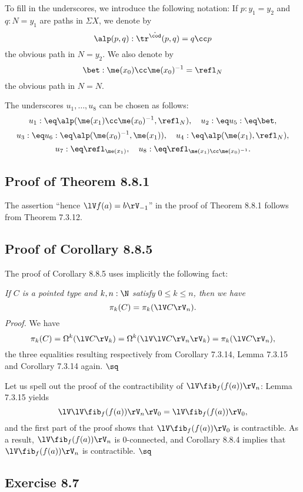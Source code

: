 \documentclass[12pt]{article}
\begin{document}
To fill in the underscores, we introduce the following notation: If $p:y_1=y_2$ and $q:N=y_1$ are paths in $\Sigma X$, we denote by 
$$
\alp(p,q):\tr^{\hat{\cod}}(p,q)=q\cc p
$$ 
the obvious path in $N=y_2$. We also denote by 
$$
\bet:\me(x_0)\cc\me(x_0)^{-1}=\refl_N
$$ 
the obvious path in $N=N$. 

The underscores $u_1,\dots,u_8$ can be chosen as follows:
$$
u_1:\eq\alp(\me(x_1)\cc\me(x_0)^{-1},\refl_N),\quad u_2:\eq u_5:\eq\bet,
$$ 
$$
u_3:\eq u_6:\eq\alp(\me(x_0)^{-1},\me(x_1)),\quad u_4:\eq\alp(\me(x_1),\refl_N),
$$ 
$$
u_7:\eq\refl_{\me(x_1)},\quad u_8:\eq\refl_{\me(x_1)\cc\me(x_0)^{-1}}.
$$


\subsection{Proof of Theorem 8.8.1}

The assertion ``hence $\lV f(a)=b\rV_{-1}$'' in the proof of Theorem 8.8.1 follows from Theorem 7.3.12.


\subsection{Proof of Corollary 8.8.5}

The proof of Corollary 8.8.5 uses implicitly the following fact:

\nn\emph{If $C$ is a pointed type and $k,n:\N$ satisfy $0\le k\le n$, then we have} 
$$
\pi_k(C)=\pi_k(\lV C\rV_n).
$$
\emph{Proof.} We have 
$$
\pi_k(C)=\Omega^k(\lV C\rV_k)=\Omega^k(\lV\lV C\rV_n\rV_k)=\pi_k(\lV C\rV_n),
$$ 
the three equalities resulting respectively from Corollary 7.3.14, Lemma 7.3.15 and Corollary 7.3.14 again. $\sq$

Let us spell out the proof of the contractibility of $\lV\fib_f(f(a))\rV_n$: Lemma 7.3.15 yields 
$$
\lV\lV\fib_f(f(a))\rV_n\rV_0=\lV\fib_f(f(a))\rV_0,
$$ 
and the first part of the proof shows that $\lV\fib_f(f(a))\rV_0$ is contractible. As a result, $\lV\fib_f(f(a))\rV_n$ is 0-connected, and Corollary 8.8.4 implies that $\lV\fib_f(f(a))\rV_n$ is contractible. $\sq$


\subsection{Exercise 8.7}
\end{document}
